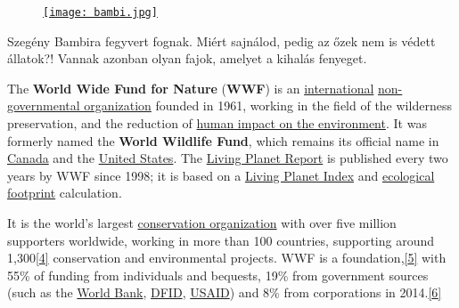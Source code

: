 \documentclass[12pt,a4paper]{scrartcl}
\newenvironment{ajanlofig}{\begin{figure}\begin{center}}{
\end{center}\end{figure}}
\begin{document}
\begin{ajanlo}

\begin{ajanlofig}

\href{https://en.wikipedia.org/wiki/World_Wide_Fund_for_Nature}{\texttt{[image: bambi.jpg]}}

\end{ajanlofig}

Szegény Bambira fegyvert fognak. Miért sajnálod, pedig az őzek nem is
védett állatok?! Vannak azonban olyan fajok, amelyet a kihalás fenyeget.

The \textbf{World Wide Fund for Nature} (\textbf{WWF}) is an
\href{https://en.wikipedia.org/wiki/Internationalism_(politics)}{international}
\href{https://en.wikipedia.org/wiki/Non-governmental_organization}{non-governmental
organization} founded in 1961, working in the field of the wilderness
preservation, and the reduction of
\href{https://en.wikipedia.org/wiki/Human_impact_on_the_environment}{human
impact on the environment}. It was formerly named the \textbf{World
Wildlife Fund}, which remains its official name in
\href{https://en.wikipedia.org/wiki/Canada}{Canada} and the
\href{https://en.wikipedia.org/wiki/United_States}{United States}. The
\href{https://en.wikipedia.org/wiki/Living_Planet_Report}{Living Planet
Report} is published every two years by WWF since 1998; it is based on a
\href{https://en.wikipedia.org/wiki/Living_Planet_Index}{Living Planet
Index} and
\href{https://en.wikipedia.org/wiki/Ecological_footprint}{ecological
footprint} calculation.

It is the world's largest
\href{https://en.wikipedia.org/wiki/Conservation_organization}{conservation
organization} with over five million supporters worldwide, working in
more than 100 countries, supporting around
1,300\href{https://en.wikipedia.org/wiki/World_Wide_Fund_for_Nature\#cite_note-4}{{[}4{]}}
conservation and environmental projects. WWF is a
foundation,\href{https://en.wikipedia.org/wiki/World_Wide_Fund_for_Nature\#cite_note-5}{{[}5{]}}
with 55\% of funding from individuals and bequests, 19\% from government
sources (such as the
\href{https://en.wikipedia.org/wiki/World_Bank}{World Bank},
\href{https://en.wikipedia.org/wiki/Department_for_International_Development}{DFID},
\href{https://en.wikipedia.org/wiki/United_States_Agency_for_International_Development}{USAID})
and 8\% from corporations in
2014.\href{https://en.wikipedia.org/wiki/World_Wide_Fund_for_Nature\#cite_note-WWF-INT_Annual_Review-6}{{[}6{]}}

\end{ajanlo}
\end{document}

